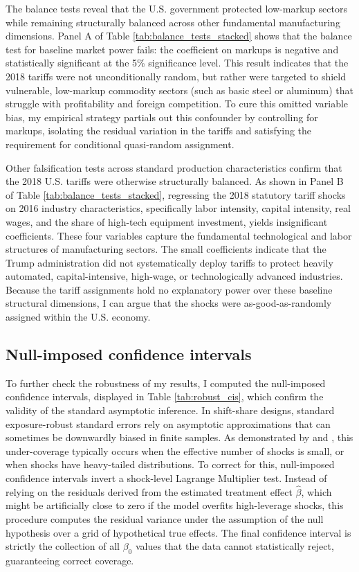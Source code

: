 \documentclass[12pt]{article}
\numberwithin{figure}{section}
\numberwithin{table}{section}
\begin{document}
The balance tests reveal that the U.S. government protected low-markup sectors while remaining structurally balanced across other fundamental manufacturing dimensions. Panel A of Table \ref{tab:balance_tests_stacked} shows that the balance test for baseline market power fails: the coefficient on markups is negative and statistically significant at the 5\% significance level. This result indicates that the 2018 tariffs were not unconditionally random, but rather were targeted to shield vulnerable, low-markup commodity sectors (such as basic steel or aluminum) that struggle with profitability and foreign competition. To cure this omitted variable bias, my empirical strategy partials out this confounder by controlling for markups, isolating the residual variation in the tariffs and satisfying the requirement for conditional quasi-random assignment.

Other falsification tests across standard production characteristics confirm that the 2018 U.S. tariffs were otherwise structurally balanced. As shown in Panel B of Table \ref{tab:balance_tests_stacked}, regressing the 2018 statutory tariff shocks on 2016 industry characteristics, specifically labor intensity, capital intensity, real wages, and the share of high-tech equipment investment, yields insignificant coefficients. These four variables capture the fundamental technological and labor structures of manufacturing sectors. The small coefficients indicate that the Trump administration did not systematically deploy tariffs to protect heavily automated, capital-intensive, high-wage, or technologically advanced industries. Because the tariff assignments hold no explanatory power over these baseline structural dimensions, I can argue that the shocks were as-good-as-randomly assigned within the U.S. economy.\\


\subsection{Null-imposed confidence intervals}

To further check the robustness of my results, I computed the null-imposed confidence intervals, displayed in Table \ref{tab:robust_cis}, which confirm the validity of the standard asymptotic inference. In shift-share designs, standard exposure-robust standard errors rely on asymptotic approximations that can sometimes be downwardly biased in finite samples. As demonstrated by \cite{Adao2019} and \cite{BHJ2022}, this under-coverage typically occurs when the effective number of shocks is small, or when shocks have heavy-tailed distributions. To correct for this, null-imposed confidence intervals invert a shock-level Lagrange Multiplier test. Instead of relying on the residuals derived from the estimated treatment effect $\hat{\beta}$, which might be artificially close to zero if the model overfits high-leverage shocks, this procedure computes the residual variance under the assumption of the null hypothesis over a grid of hypothetical true effects. The final confidence interval is strictly the collection of all $\beta_0$ values that the data cannot statistically reject, guaranteeing correct coverage.
\end{document}
